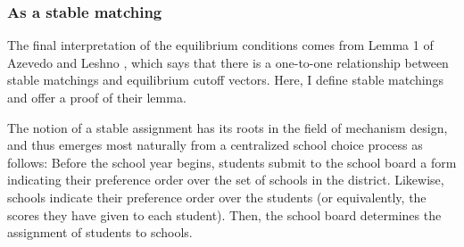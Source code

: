 \documentclass[12pt]{article}
\theoremstyle{definition}
\begin{document}
%
%
%

\subsubsection{As a stable matching}
The final interpretation of the equilibrium conditions comes from Lemma 1 of Azevedo and Leshno \parencite*{supplydemandfw}, which says that there is a one-to-one relationship between stable matchings and equilibrium cutoff vectors. Here, I define stable matchings and offer a proof of their lemma. 

The notion of a stable assignment has its roots in the field of mechanism design, and thus emerges most naturally from a centralized school choice process as follows: Before the school year begins, students submit to the school board a form indicating their preference order over the set of schools in the district. Likewise, schools indicate their preference order over the students (or equivalently, the scores they have given to each student). Then, the school board determines the assignment of students to schools.
\end{document}
